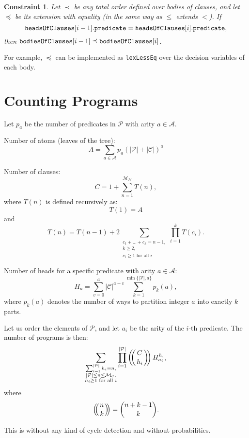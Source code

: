 \documentclass[runningheads]{llncs}
\newtheorem{constraint}{Constraint}
\newcommand{\variable}[1]{\texttt{\textup{#1}}}
\newcommand{\predicates}{\mathcal{P}}
\newcommand{\variables}{\mathcal{V}}
\newcommand{\constants}{\mathcal{C}}
\newcommand{\arities}{\mathcal{A}}
\newcommand{\maxNumNodes}{\mathcal{M}_{\mathcal{N}}}
\newcommand{\maxNumClauses}{\mathcal{M}_{\mathcal{C}}}
\def\multiset#1#2{\ensuremath{\left(\kern-.3em\left(\genfrac{}{}{0pt}{}{#1}{#2}\right)\kern-.3em\right)}}
\begin{document}
\begin{constraint}
  Let $\prec$ be any total order defined over bodies of clauses, and let
  $\preceq$ be its extension with equality (in the same way as $\le$ extends
  $<$). If
  \[
    \variable{headsOfClauses}[i-1].\variable{predicate} =
    \variable{headsOfClauses}[i].\variable{predicate},
  \]
  then $\variable{bodiesOfClauses}[i-1] \preceq \variable{bodiesOfClauses}[i]$.
\end{constraint}
For example, $\preceq$ can be implemented as \variable{lexLessEq} over the
decision variables of each body.

\section{Counting Programs}

Let $p_a$ be the number of predicates in $\predicates{}$ with arity $a \in
\arities{}$.

Number of atoms (leaves of the tree):
\[
  A = \sum_{a \in \arities{}} p_a(|\variables{}| + |\constants{}|)^a
\]

Number of clauses:
\[
  C = 1 + \sum_{n=1}^{\maxNumNodes{}} T(n),
\]
where $T(n)$ is defined recursively as:
\[
  T(1) = A
\]
and
\[
  T(n) = T(n-1) + 2\sum_{\substack{c_1 + \dots + c_k = n - 1,\\
      k \ge 2,\\
      c_i \ge 1 \text{ for all } i}} \prod_{i=1}^k T(c_i).
\]

Number of heads for a specific predicate with arity $a \in \arities{}$:
\[
  H_a = \sum_{v = 0}^a |\constants{}|^{a-v} \sum_{k=1}^{\min\{|\variables{}|,
    a\}} p_k(a),
\]
where $p_k(a)$ denotes the number of ways to partition integer $a$ into exactly
$k$ parts.

Let us order the elements of $\predicates{}$, and let $a_i$ be the arity of the
$i$-th predicate. The number of programs is then:
\[
  \sum_{\substack{ \sum_{i=1}^{|\predicates{}|} h_i = n,\\
      |\predicates{}| \le n \le \maxNumClauses,\\
      h_i \ge 1 \text{ for all } i}} \prod_{i=1}^{|\predicates{}|}
  \multiset{C}{h_i} H_{a_i}^{h_i},
\]
where
\[
  \multiset{n}{k} = \binom{n + k - 1}{k}.
\]

This is without any kind of cycle detection and without probabilities.
\end{document}
